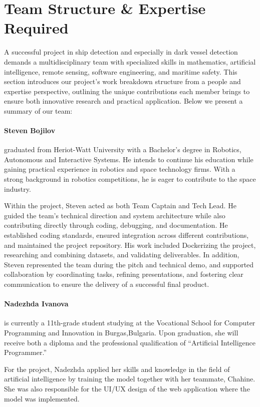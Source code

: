 \documentclass{article}
\begin{document}
	\section{Team Structure \& Expertise Required}
	A successful project in ship detection and especially in dark vessel detection demands a multidisciplinary team with specialized skills in mathematics, artificial intelligence, remote sensing, software engineering, and maritime safety. 
	This section introduces our project’s work breakdown structure from a people and expertise perspective, outlining the unique contributions each member brings to ensure both innovative research and practical application.
	Below we present a summary of our team:
	
	\paragraph{Steven Bojilov} graduated from Heriot-Watt University with a Bachelor’s degree in Robotics, Autonomous and Interactive Systems. He intends to continue his education while gaining practical experience in robotics and space technology firms. With a strong background in robotics competitions, he is eager to contribute to the space industry.
	
	Within the project, Steven acted as both Team Captain and Tech Lead. He guided the team’s technical direction and system architecture while also contributing directly through coding, debugging, and documentation. He established coding standards, ensured integration across different contributions, and maintained the project repository. His work included Dockerizing the project, researching and combining datasets, and validating deliverables. In addition, Steven represented the team during the pitch and technical demo, and supported collaboration by coordinating tasks, refining presentations, and fostering clear communication to ensure the delivery of a successful final product.
	
	
	\paragraph{Nadezhda Ivanova} is currently a 11th-grade student studying at the Vocational School for Computer Programming and Innovation in Burgas,Bulgaria. Upon graduation, she will receive both a diploma and the professional qualification of “Artificial Intelligence Programmer.”
	
	For the project, Nadezhda applied her skills and knowledge in the field of artificial intelligence by training the model together with her teammate, Chahine. She was also responsible for the UI/UX design of the web application where the model was implemented. 
	
\end{document}
